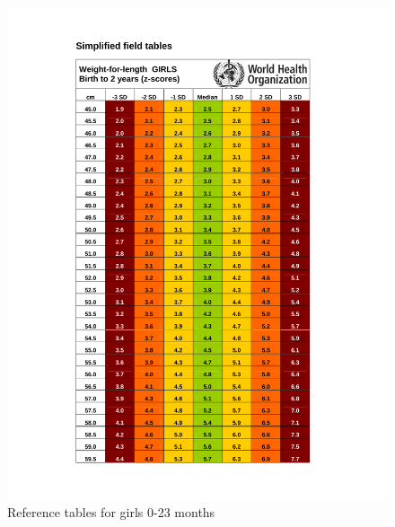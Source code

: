 \documentclass[12pt,]{book}
\theoremstyle{definition}
\theoremstyle{definition}
\theoremstyle{definition}
\theoremstyle{remark}
\begin{document}
\begin{figure}[H]
{\centering \includegraphics[width=1\linewidth]{pdf/girls_0_24} 

}

\caption{Reference tables for girls 0-23 months}\label{fig:anthro13}
\end{figure}\begin{figure}[H]


\end{figure}
\end{document}
